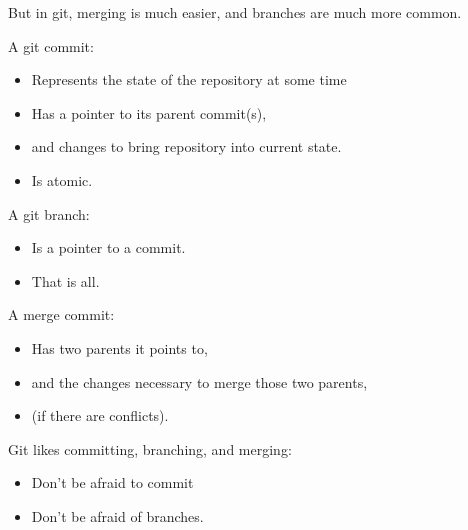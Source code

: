 \documentclass{beamer}
\begin{document}
\begin{frame}[plain]
  But in git, merging is much easier, and branches are much more common.
\end{frame}

\begin{frame}[plain]



\begin{Large}
A git commit:

\begin{itemize}
\item Represents the state of the repository at some time
\item Has a pointer to its parent commit(s),
\item and changes to bring repository into current state.
\item Is atomic.
\end{itemize}
\end{Large}
\end{frame}

\begin{frame}
\begin{Large}
A git branch:
\begin{itemize}
\item Is a pointer to a commit.
\item That is all.
\end{itemize}
\end{Large}
\end{frame}

\begin{frame}
\begin{Large}
A merge commit:
\begin{itemize}
\item Has two parents it points to,
\item and the changes necessary to merge those two parents,
\item (if there are conflicts).
\end{itemize}
\end{Large}
\end{frame}

\begin{frame}[plain]
  \begin{Large}
Git likes committing, branching, and merging:
\begin{itemize}
\item Don't be afraid to commit
\item Don't be afraid of branches.
\end{itemize}
  \end{Large}
\end{frame}
\end{document}
